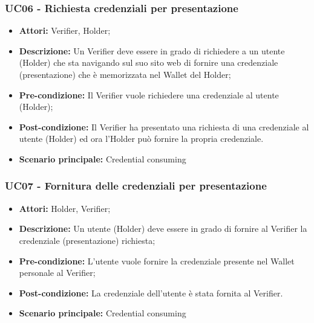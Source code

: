 \subsubsection{UC06 - Richiesta credenziali per presentazione}
\begin{itemize}
\item \textbf{Attori:} Verifier, Holder;
\item \textbf{Descrizione:} Un Verifier deve essere in grado di richiedere a un utente (Holder) che sta navigando sul suo sito web di fornire una credenziale (presentazione) che è memorizzata nel Wallet del Holder;
\item \textbf{Pre-condizione:} Il Verifier vuole richiedere una credenziale al utente (Holder);
\item \textbf{Post-condizione:} Il Verifier ha presentato una richiesta di una credenziale al utente (Holder) ed ora l'Holder può fornire la propria credenziale.
\item \textbf{Scenario principale:} Credential consuming
\end{itemize}

\subsubsection{UC07 - Fornitura delle credenziali per presentazione}
\begin{itemize}
\item \textbf{Attori:} Holder, Verifier;
\item \textbf{Descrizione:} Un utente (Holder) deve essere in grado di fornire al Verifier la credenziale (presentazione) richiesta;
\item \textbf{Pre-condizione:} L’utente vuole fornire la credenziale presente nel Wallet personale al Verifier;
\item \textbf{Post-condizione:} La credenziale dell’utente è stata fornita al Verifier.
\item \textbf{Scenario principale:} Credential consuming
\end{itemize}

